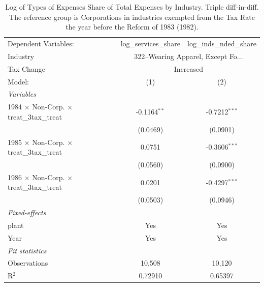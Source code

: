 \documentclass[
  12pt]{article}
\theoremstyle{definition}
\theoremstyle{remark}
\begin{document}
\begin{table}

\caption{\label{tbl-reg-exp-inds}Log of Types of Expenses Share of Total
Expenses by Industry. Triple diff-in-diff. The reference group is
Corporations in industries exempted from the Tax Rate the year before
the Reform of 1983 (1982).}

\begin{minipage}{\linewidth}

\begingroup
\centering
\begin{tabular}{lcc}
   \tabularnewline \midrule \midrule
   Dependent Variables:                                    & log\_services\_share   & log\_inds\_nded\_share\\     
   Industry & \multicolumn{2}{c}{322–Wearing Apparel, Except Fo...} \\ 
   Tax Change & \multicolumn{2}{c}{Increased} \\ 
   Model:                                                  & (1)                    & (2)\\  
   \midrule
   \emph{Variables}\\
   1984 $\times$ Non-Corp. $\times$ treat\_3tax\_treat     & -0.1164$^{**}$         & -0.7212$^{***}$\\   
                                                           & (0.0469)               & (0.0901)\\   
   1985 $\times$ Non-Corp. $\times$ treat\_3tax\_treat     & 0.0751                 & -0.3606$^{***}$\\   
                                                           & (0.0560)               & (0.0900)\\   
   1986 $\times$ Non-Corp. $\times$ treat\_3tax\_treat     & 0.0201                 & -0.4297$^{***}$\\   
                                                           & (0.0503)               & (0.0946)\\   
   \midrule
   \emph{Fixed-effects}\\
   plant                                                   & Yes                    & Yes\\  
   Year                                                    & Yes                    & Yes\\  
   \midrule
   \emph{Fit statistics}\\
   Observations                                            & 10,508                 & 10,120\\  
   R$^2$                                                   & 0.72910                & 0.65397\\  

\end{tabular}
\end{minipage}
\end{table}
\end{document}
